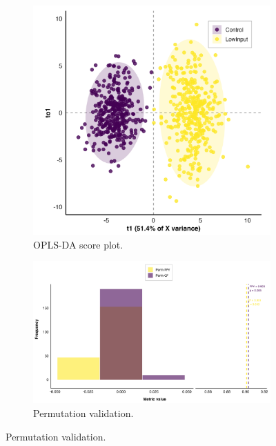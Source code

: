 \documentclass[10pt,letterpaper]{article}
\begin{document}
\begin{figure}[htbp]
  \centering

  \begin{subfigure}[b]{0.48\textwidth}
    \includegraphics[width=\textwidth]{fig/main/Fig2a_OPLS_scores_plot.png}
    \caption{OPLS-DA score plot.} 
    \label{fig:opls_scores}
  \end{subfigure}
  \begin{subfigure}[b]{0.48\textwidth}
    \includegraphics[width=\textwidth]{fig/main/Fig2b_OPLS_permutation_plot.png}
    \caption{Permutation validation. }
    \label{fig:opls_perm}
  \end{subfigure}


\end{figure}
\end{document}
